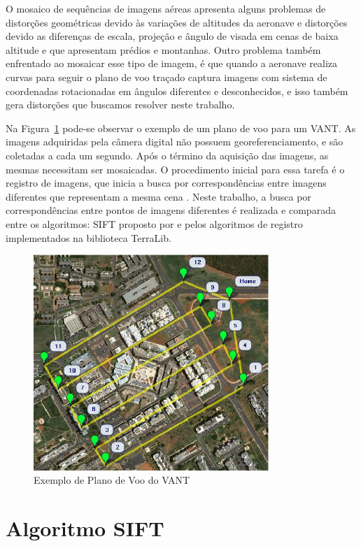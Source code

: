 \documentclass[9pt, a4paper, nofonttune, journal]{IEEEtran}
\begin{document}
O mosaico de sequências de imagens aéreas apresenta alguns problemas de distorções geométricas devido às variações de altitudes da aeronave e distorções devido as diferenças de escala, projeção e ângulo de visada em cenas de baixa altitude e que apresentam prédios e montanhas. Outro problema também enfrentado ao mosaicar esse tipo de imagem, é que quando a aeronave realiza curvas para seguir o plano de voo traçado captura imagens com sistema de coordenadas rotacionadas em ângulos diferentes e desconhecidos, e isso também gera distorções que buscamos resolver neste trabalho.

Na Figura~\ref{fig:plano_voo} pode-se observar o exemplo de um plano de voo para um VANT. As imagens adquiridas pela câmera digital não possuem georeferenciamento, e são coletadas a cada um segundo. Após o término da aquisição das imagens, as mesmas necessitam ser mosaicadas. O procedimento inicial para essa tarefa é o registro de imagens, que inicia a busca por correspondências entre imagens diferentes que representam a mesma cena \cite{goltz1}. Neste trabalho, a busca por correspondências entre pontos de imagens diferentes é realizada e comparada entre os algoritmos: SIFT proposto por \cite{lowe} e pelos algoritmos de registro implementados na biblioteca TerraLib.

\begin{figure}[h!t]
  \centering
  \includegraphics[width=3.5in]{figuras/plano_voo.png}
  \caption{Exemplo de Plano de Voo do VANT}
  \label{fig:plano_voo}
\end{figure}

\section{Algoritmo SIFT}
\end{document}
